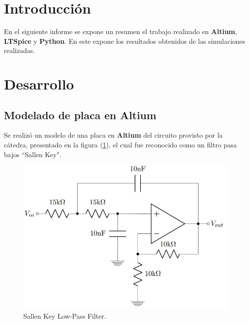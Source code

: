 \documentclass[a4paper]{article}
\begin{document}




\section*{Introducción}

En el siguiente informe se expone un resumen el trabajo realizado en \textbf{Altium}, \textbf{LTSpice} y \textbf{Python}. En este expone los resultados obtenidos de las simulaciones realizadas.

\section*{Desarrollo}

\subsection*{Modelado de placa en Altium}
Se realizó un modelo de una placa en \textbf{Altium} del circuito provisto por la cátedra, presentado en la figura (\ref{fig:AltiumCirc}), el cual fue reconocido como un filtro pasa bajos ``Sallen Key".


\begin{figure}[H]
	\centering
	\includegraphics[width=\textwidth]{Altium-Circuito}
	\caption{Sallen Key Low-Pass Filter.}
	\label{fig:AltiumCirc}
\end{figure}
\end{document}
